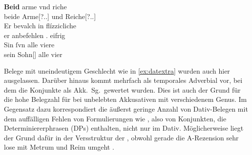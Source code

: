 \begin{exe}
\begin{xlist}
	\ex \label{ex:datextra_2}
		\gll \textbf{Beid} arme vnd riche \\
			beide Arme[\Dat?.\Pl.\MascA] und Reiche[\Dat?.\Pl.\MascA] \\
	\sn \gll Er bevalch in flízzicliche \\
			er anbefehlen \Tpl.\Dat{} eifrig \\
	\sn \gll Sin ſvn alle viere \\
			sein Sohn[\Pl] alle vier \\
		\begin{taggedline}{\parencites[\pno~94\rb, 23--26]{kc:VB}[zu][13854--13855]{schroeder1895}}
		\trans {}
		\end{taggedline}
	\end{xlist}
\end{exe}

Belege mit uneindeutigem Geschlecht wie in \cref{ex:datextra} wurden auch hier
ausgelassen. Darüber hinaus kommt   mehrfach als temporales Adverbial vor, bei dem die
Konjunkte als Akk.\ Sg.\ gewertet wurden. Dies ist auch der Grund für die hohe
Belegzahl für  bei unbelebten Akkusativen mit verschiedenem Genus.
Im Gegensatz dazu korrespondiert die äußerst geringe Anzahl von Dativ-Belegen
mit dem auffälligen Fehlen von Formulierungen wie  
\autocites(Augsburg, 1280)[\pno~429, 382.8]{cao1}, also von Konjunkten, die
Determiniererphrasen (DPs) enthalten, nicht nur im Dativ. Möglicherweise liegt
der Grund dafür in der Versstruktur der \KC{}, obwohl gerade die
A-Rezension sehr lose mit Metrum und Reim umgeht \autocite[92]{wolf2008}.

